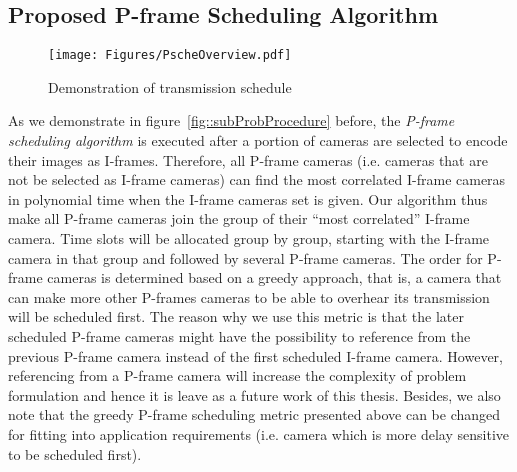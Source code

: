\subsection{Proposed P-frame Scheduling Algorithm}
\label{sec::PFrameScheduling}
\begin{figure}
\begin{center}
\texttt{[image: Figures/PscheOverview.pdf]}
\caption{\label{fig::pScheOverview}Demonstration of transmission schedule}
\end{center}
\end{figure}
As we demonstrate in figure~\ref{fig::subProbProcedure} before, the \emph{P-frame scheduling algorithm} is executed after a portion of cameras are selected to encode their images as I-frames.
Therefore, all P-frame cameras (i.e. cameras that are not be selected as I-frame cameras) can find the most correlated I-frame cameras in polynomial time when the I-frame cameras set is given.
Our algorithm thus make all P-frame cameras join the group of their ``most correlated'' I-frame camera.
Time slots will be allocated group by group, starting with the I-frame camera in that group and followed by several P-frame cameras.
The order for P-frame cameras is determined based on a greedy approach, that is, a camera that can make more other P-frames cameras to be able to overhear its transmission will be scheduled first.
The reason why we use this metric is that the later scheduled P-frame cameras might have the possibility to reference from the previous P-frame camera instead of the first scheduled I-frame camera.
However, referencing from a P-frame camera will increase the complexity of problem formulation and hence it is leave as a future work of this thesis.
Besides, we also note that the greedy P-frame scheduling metric presented above can be changed for fitting into application requirements (i.e. camera which is more delay sensitive to be scheduled first).

